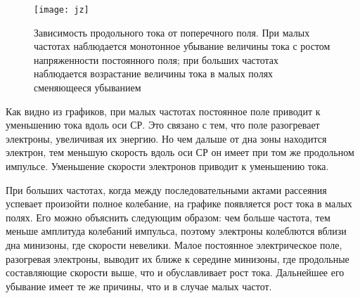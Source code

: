 \begin{figure}[h!]
    \center
    \texttt{[image: jz]}
    \caption{Зависимость продольного тока от поперечного поля. При малых частотах наблюдается монотонное убывание величины тока с ростом напряженности постоянного поля; при больших частотах наблюдается возрастание величины тока в малых полях сменяющееся убыванием}
    \label{fig:jz}
\end{figure}
Как видно из графиков, при малых частотах постоянное поле приводит к уменьшению тока вдоль оси СР. Это связано с тем, что поле разогревает электроны, увеличивая их энергию. Но чем дальше от дна зоны находится электрон, тем меньшую скорость вдоль оси СР он имеет при том же продольном импульсе. Уменьшение скорости электронов приводит к уменьшению тока.

При больших частотах, когда между последовательными актами рассеяния успевает произойти полное колебание, на графике появляется рост тока в малых полях. Его можно объяснить следующим образом: чем больше частота, тем меньше амплитуда колебаний импульса, поэтому электроны колеблются вблизи дна минизоны, где скорости невелики. Малое постоянное электрическое поле, разогревая электроны, выводит их ближе к середине минизоны, где продольные составляющие скорости выше, что и обуславливает рост тока. Дальнейшее его убывание имеет те же причины, что и в случае малых частот.

